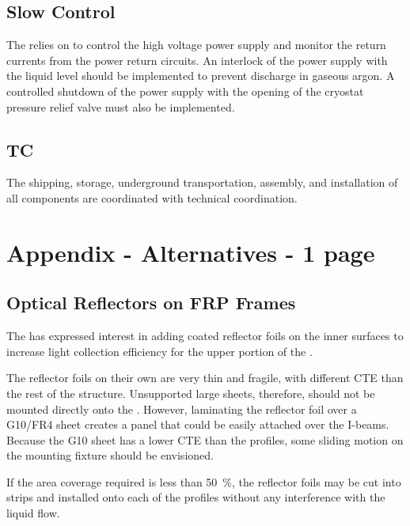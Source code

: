 \subsection{Slow Control}
\label{sec:fddp-hv-intfc-to-cisc}

The  relies on  to control the high voltage power supply and monitor the return currents from the  power return circuits.  An interlock of the  power supply with the liquid level should be implemented to prevent  discharge in gaseous argon.  A controlled shutdown of the  power supply with the opening of the cryostat pressure relief valve must also be implemented.

\subsection{TC}
\label{sec:fddp-hv-intfc-to-tc}

The shipping, storage, underground transportation, assembly, and installation of all  components are coordinated with technical coordination.


\clearpage

\section{Appendix - Alternatives - 1 page}

\subsection{Optical Reflectors on  FRP Frames}

The \dual {} has expressed interest in adding  coated reflector foils on the  inner surfaces to increase light collection efficiency for the upper portion of the .  

The reflector foils on their own are very thin and fragile, with different CTE than the rest of the  structure. Unsupported large sheets, therefore, should not be mounted directly onto the .  However, laminating the reflector foil over a G10/FR4 sheet creates a panel that could be easily attached over the  I-beams.  Because the G10 sheet has a lower CTE than the  profiles, some sliding motion on the mounting fixture should be envisioned.

If the area coverage required is less than \num{50}~\%, the reflector foils may be cut into strips and  installed onto each of the  profiles without any interference with the liquid flow.

